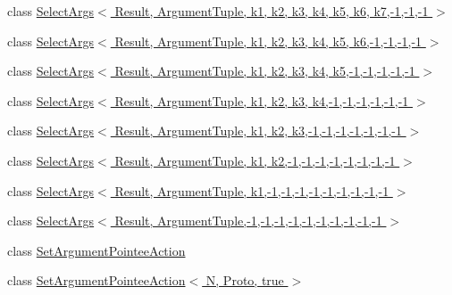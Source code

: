 \begin{DoxyCompactItemize}
\item 
class \hyperlink{classtesting_1_1internal_1_1SelectArgs_3_01Result_00_01ArgumentTuple_00_01k1_00_01k2_00_01k3_00_d8106922b84b5ce2491b61ffee01e097}{Select\+Args$<$ Result, Argument\+Tuple, k1, k2, k3, k4, k5, k6, k7,-\/1,-\/1,-\/1 $>$}
\item 
class \hyperlink{classtesting_1_1internal_1_1SelectArgs_3_01Result_00_01ArgumentTuple_00_01k1_00_01k2_00_01k3_00_c6c29b62346e4d7879bc19ed55d96004}{Select\+Args$<$ Result, Argument\+Tuple, k1, k2, k3, k4, k5, k6,-\/1,-\/1,-\/1,-\/1 $>$}
\item 
class \hyperlink{classtesting_1_1internal_1_1SelectArgs_3_01Result_00_01ArgumentTuple_00_01k1_00_01k2_00_01k3_00_03a25384b3e8dae1359a943456ce6fe0}{Select\+Args$<$ Result, Argument\+Tuple, k1, k2, k3, k4, k5,-\/1,-\/1,-\/1,-\/1,-\/1 $>$}
\item 
class \hyperlink{classtesting_1_1internal_1_1SelectArgs_3_01Result_00_01ArgumentTuple_00_01k1_00_01k2_00_01k3_00_164a629d34739a5312e400f464e1fa29}{Select\+Args$<$ Result, Argument\+Tuple, k1, k2, k3, k4,-\/1,-\/1,-\/1,-\/1,-\/1,-\/1 $>$}
\item 
class \hyperlink{classtesting_1_1internal_1_1SelectArgs_3_01Result_00_01ArgumentTuple_00_01k1_00_01k2_00_01k3_00-ec796500c928719576d12fb062fb620e}{Select\+Args$<$ Result, Argument\+Tuple, k1, k2, k3,-\/1,-\/1,-\/1,-\/1,-\/1,-\/1,-\/1 $>$}
\item 
class \hyperlink{classtesting_1_1internal_1_1SelectArgs_3_01Result_00_01ArgumentTuple_00_01k1_00_01k2_00-1_00-1_08f7e2e7b6e994b5dc88747b054e9df66}{Select\+Args$<$ Result, Argument\+Tuple, k1, k2,-\/1,-\/1,-\/1,-\/1,-\/1,-\/1,-\/1,-\/1 $>$}
\item 
class \hyperlink{classtesting_1_1internal_1_1SelectArgs_3_01Result_00_01ArgumentTuple_00_01k1_00-1_00-1_00-1_00-1_00-1_00-1_00-1_00-1_00-1_01_4}{Select\+Args$<$ Result, Argument\+Tuple, k1,-\/1,-\/1,-\/1,-\/1,-\/1,-\/1,-\/1,-\/1,-\/1 $>$}
\item 
class \hyperlink{classtesting_1_1internal_1_1SelectArgs_3_01Result_00_01ArgumentTuple_00-1_00-1_00-1_00-1_00-1_00-1_00-1_00-1_00-1_00-1_01_4}{Select\+Args$<$ Result, Argument\+Tuple,-\/1,-\/1,-\/1,-\/1,-\/1,-\/1,-\/1,-\/1,-\/1,-\/1 $>$}
\item 
class \hyperlink{classtesting_1_1internal_1_1SetArgumentPointeeAction}{Set\+Argument\+Pointee\+Action}
\item 
class \hyperlink{classtesting_1_1internal_1_1SetArgumentPointeeAction_3_01N_00_01Proto_00_01true_01_4}{Set\+Argument\+Pointee\+Action$<$ N, Proto, true $>$}

\end{DoxyCompactItemize}
